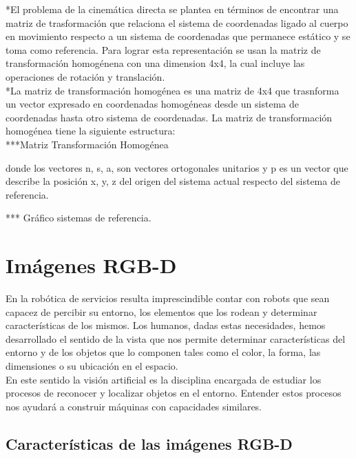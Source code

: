 \documentclass[a4paper, openright, 12pt]{report}
\begin{document}
			*El problema de la cinemática directa se plantea en términos de encontrar una matriz de trasformación que relaciona el sistema de coordenadas ligado al cuerpo en movimiento respecto a un sistema de coordenadas que permanece estático y se toma como referencia. Para lograr esta representación se usan la matriz de transformación homogénena con una dimension 4x4, la cual incluye las operaciones de rotación y translación.\\

			*La matriz de transformación homogénea es una matriz de 4x4 que trasnforma un vector expresado en coordenadas homogéneas desde un sistema de coordenadas hasta otro sistema de coordenadas. La matriz de transformación homogénea tiene la siguiente estructura:\\

			***Matriz Transformación Homogénea

			donde los vectores n, s, a, son vectores ortogonales unitarios y p es un vector que describe la posición x, y, z del origen del sistema actual respecto del sistema de referencia.

			*** Gráfico sistemas de referencia.







	\section{Imágenes RGB-D}
		En la robótica de servicios resulta imprescindible contar con robots que sean capacez de percibir su entorno, los elementos que los rodean y determinar características de los mismos. Los humanos, dadas estas necesidades, hemos desarrollado el sentido de la vista que nos permite determinar características del entorno y de los objetos que lo componen tales como el color, la forma, las dimensiones o su ubicación en el espacio.\\

		En este sentido la visión artificial es la disciplina encargada de estudiar los procesos de reconocer y localizar objetos en el entorno. Entender estos procesos nos ayudará a construir máquinas con capacidades similares.\\


		\subsection{Características de las imágenes RGB-D}
\end{document}
